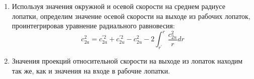\begin{enumerate}
	\item Используя значения окружной и осевой скорости на среднем радиусе лопатки, определим значение осевой скорости на выходе из рабочих лопаток, проинтегрировав уравнение радиального равновесия:
		$$
			c_{2a}^2 = c_{2a}^{\prime 2} + c_{2u}^{\prime 2} - c_{2u}^{2} - 2 \int_{r^\prime}^r \frac{c_{2u}^2}{r} dr
		$$
%

	\item Значения проекций относительной скорости на выходе из лопаток находим так же, как и значения на входе в рабочие лопатки.



\end{enumerate}